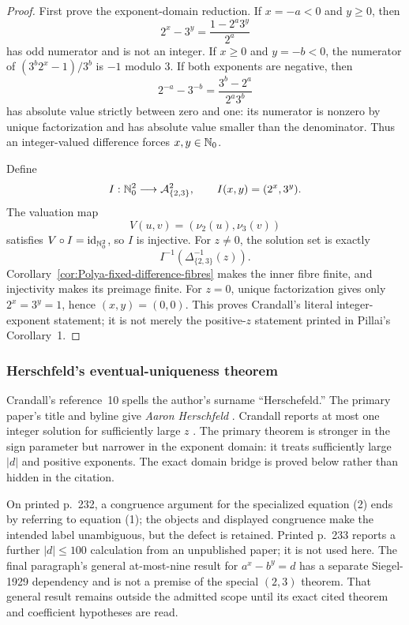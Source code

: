 \begin{proof}
First prove the exponent-domain reduction.  If $x=-a<0$ and $y\geq0$, then
\[
 2^x-3^y=\frac{1-2^a3^y}{2^a}
\]
has odd numerator and is not an integer.  If $x\geq0$ and $y=-b<0$, the
numerator of $(3^b2^x-1)/3^b$ is $-1$ modulo $3$.  If both exponents are
negative, then
\[
 2^{-a}-3^{-b}=\frac{3^b-2^a}{2^a3^b}
\]
has absolute value strictly between zero and one: its numerator is nonzero
by unique factorization and has absolute value smaller than the denominator.
Thus an integer-valued difference forces $x,y\in\mathbb{N}_{0}$.

Define
\[
 I:\mathbb{N}_{0}^2\longrightarrow\mathcal A_{\{2,3\}}^2,
 \qquad I(x,y)=(2^x,3^y).
\]
The valuation map
\[
 V(u,v)=(\nu_2(u),\nu_3(v))
\]
satisfies $V\circ I=\operatorname{id}_{\mathbb{N}_{0}^2}$, so $I$ is injective.  For
$z\neq0$,
the solution set is exactly
\[
 I^{-1}\!\left(\Delta_{\{2,3\}}^{-1}(z)\right).
\]
Corollary~\ref{cor:Polya-fixed-difference-fibres} makes the inner fibre
finite, and injectivity makes its preimage finite.  For $z=0$, unique
factorization gives only
$2^x=3^y=1$, hence $(x,y)=(0,0)$.  This proves Crandall's literal integer-
exponent statement; it is not merely the positive-$z$ statement printed in
Pillai's Corollary~1.
\end{proof}

\subsubsection{Herschfeld's eventual-uniqueness theorem}

Crandall's reference~10 spells the author's surname ``Herschefeld.''  The
primary paper's title and byline give \emph{Aaron Herschfeld}
\cite[pp.~231--234]{Herschfeld1936}.  Crandall reports at most one integer
solution for sufficiently large $z$ \cite[p.~1288]{Crandall1978}.  The
primary theorem is stronger in the sign parameter but narrower in the
exponent domain: it treats sufficiently large $|d|$ and positive exponents.
The exact domain bridge is proved below rather than hidden in the citation.

\begin{sourceissue}
\label{sourceissue:Herschfeld-boundaries}
On printed p.~232, a congruence argument for the specialized equation (2)
ends by referring to equation (1); the objects and displayed congruence make
the intended label unambiguous, but the defect is retained.  Printed p.~233
reports a further $|d|\leq100$ calculation from an unpublished paper; it is
not used here.  The final paragraph's general at-most-nine result for
$a^x-b^y=d$ has a separate Siegel-1929 dependency and is not a premise of the
special $(2,3)$ theorem.  That general result remains outside the admitted
scope until its exact cited theorem and coefficient hypotheses are read.
\end{sourceissue}

